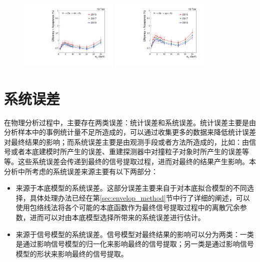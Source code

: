 \begin{figure}[htbp]
  \begin{center}
		\includegraphics[width=0.42\textwidth]{figures/chapter04/eff_ele.pdf}
        \includegraphics[width=0.42\textwidth]{figures/chapter04/eff_mu.pdf} \\
    \label{fig:sig_norm}
\end{center}
\end{figure}

\section{系统误差}\label{sec:Sys}

在物理分析过程中，主要存在两类误差：统计误差和系统误差。统计误差主要是由分析样本中的事例统计量不足所造成的，可以通过收集更多的数据来降低统计误差对最终结果的影响；而系统误差主要是由观测手段或者方法所造成的，比如：由信号或者本底建模时所产生的误差、重建探测器中对撞粒子对象时所产生的误差等等。这些系统误差会传递到最终的信号提取过程，进而对最终的结果产生影响。本分析中所考虑的系统误差来源主要有以下两部分：
\begin{itemize}
    \item 来源于本底模型的系统误差。这部分误差主要来自于对本底拟合模型的不同选择，具体处理办法已经在第\ref{sec:envelop_method}节中行了详细的阐述，可以使用包络线法将各个可能的本底函数作为最终信号提取过程中的离散冗余参数，进而可以对由本底模型选择所带来的系统误差进行估计。
    \item 来源于信号模型的系统误差。信号模型对最终结果的影响可以分为两类：一类是通过影响信号模型的归一化来影响最终的信号提取；另一类是通过影响信号模型的形状来影响最终的信号提取。
\end{itemize}

